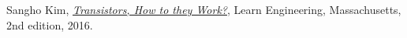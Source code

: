 \begin{thebibliography}{9} %

  Sangho Kim,
  \href{https://www.youtube.com/watch?v=7ukDKVHnac4}{\emph{Transistors, How to they Work?}},
  Learn Engineering, Massachusetts,
  2nd edition,
  2016.

\end{thebibliography}
%
%
%
